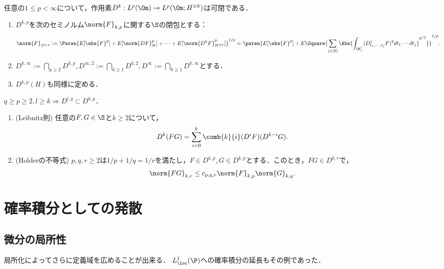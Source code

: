 \documentclass[uplatex,dvipdfmx]{jsreport}
\begin{document}
\begin{proposition}
    任意の$1\le p<\infty$について，作用素$D^k:L^p(\Om)\to L^p(\Om;H^{\otimes k})$は可閉である．
\end{proposition}

\begin{definition}\mbox{}
    \begin{enumerate}
        \item $D^{k,p}$を次のセミノルム$\norm{F}_{k,p}$に関する$\S$の閉包とする：
        \[\norm{F}_{D^{k,p}}:=\Paren{E[\abs{F}^p]+E[\norm{DF}^p_H]+\cdots+E[\norm{D^kF}^p_{H^{\otimes k}}]}^{1/p}=\paren{E[\abs{F}^p]+E\Square{\sum_{j\in[k]}\Abs{\int_{\R^j_+}(D_{t_1,\cdots,t_j}^jF)^2dt_1\cdots dt_j}^{p/2}}}^{1/p}.\]
        \item $D^{k,\infty}:=\bigcap_{p\ge2}D^{k,p},D^{\infty,2}:=\bigcap_{k\ge1}D^{k,2},D^\infty:=\bigcap_{k\ge1}D^{k,\infty}$とする．
        \item $D^{k,p}(H)$も同様に定める．
    \end{enumerate}
\end{definition}
\begin{remarks}
    $q\ge p\ge 2,l\ge k\Rightarrow D^{l,q}\subset D^{k,p}$．
\end{remarks}

\begin{proposition}\mbox{}
    \begin{enumerate}
        \item (Leibnitz則) 任意の$F,G\in\S$と$k\ge2$について，
        \[D^k(FG)=\sum_{i=0}^k\comb{k}{i}(D^iF)(D^{k-i}G).\]
        \item (Holderの不等式) $p,q,r\ge2$は$1/p+1/q=1/r$を満たし，$F\in D^{k,p},G\in D^{k,p}$とする．このとき，$FG\in D^{k,r}$で，
        \[\norm{FG}_{k,r}\le c_{p,q,r}\norm{F}_{k,p}\norm{G}_{k,q}.\]
    \end{enumerate}
\end{proposition}

\section{確率積分としての発散}

\subsection{微分の局所性}

\begin{tcolorbox}[colframe=ForestGreen, colback=ForestGreen!10!white,breakable,colbacktitle=ForestGreen!40!white,coltitle=black,fonttitle=\bfseries\sffamily,
title=]
    局所化によってさらに定義域を広めることが出来る．
    $L^1_\loc(\P)$への確率積分の延長もその例であった．
\end{tcolorbox}
\end{document}
